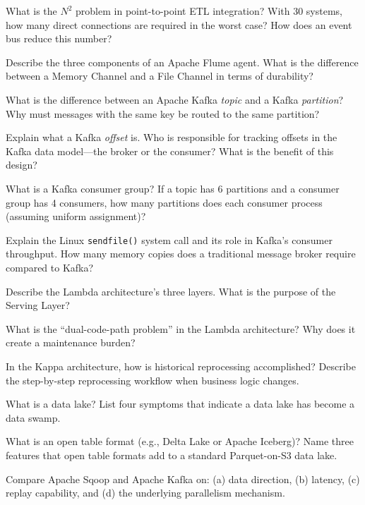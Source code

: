 
\sq What is the $N^2$ problem in point-to-point ETL integration? With 30
systems, how many direct connections are required in the worst case? How
does an event bus reduce this number?

\sq Describe the three components of an Apache Flume agent. What is the
difference between a Memory Channel and a File Channel in terms of
durability?

\sq What is the difference between an Apache Kafka \emph{topic} and a
Kafka \emph{partition}? Why must messages with the same key be routed to
the same partition?

\sq Explain what a Kafka \emph{offset} is. Who is responsible for tracking
offsets in the Kafka data model---the broker or the consumer? What is the
benefit of this design?

\sq What is a Kafka consumer group? If a topic has 6 partitions and a
consumer group has 4 consumers, how many partitions does each consumer
process (assuming uniform assignment)?

\sq Explain the Linux \texttt{sendfile()} system call and its role in
Kafka's consumer throughput. How many memory copies does a traditional
message broker require compared to Kafka?

\sq Describe the Lambda architecture's three layers. What is the purpose
of the Serving Layer?

\sq What is the ``dual-code-path problem'' in the Lambda architecture?
Why does it create a maintenance burden?

\sq In the Kappa architecture, how is historical reprocessing accomplished?
Describe the step-by-step reprocessing workflow when business logic
changes.

\sq What is a data lake? List four symptoms that indicate a data lake has
become a data swamp.

\sq What is an open table format (e.g., Delta Lake or Apache Iceberg)?
Name three features that open table formats add to a standard Parquet-on-S3
data lake.

\sq Compare Apache Sqoop and Apache Kafka on: (a) data direction, (b) latency,
(c) replay capability, and (d) the underlying parallelism mechanism.


